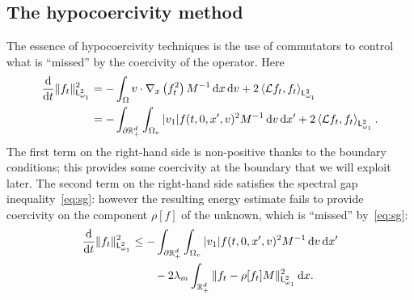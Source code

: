 \documentclass[11pt]{amsart}
\theoremstyle{definition}
\theoremstyle{remark}
\numberwithin{equation}{section}
\newcommand\R{{\mathbb R}}
\newcommand{\dd}{{\, \mathrm d}}
\newcommand{\dt}{\frac{{\rm d}}{{\rm d}t}}
\newcommand{\init}{\text{{\tiny {\rm in}}}}
\newcommand{\sfL}{\mathsf{L}}
\begin{document}

\subsection{The hypocoercivity method}

The essence of hypocoercivity techniques is the use of commutators to control what is ``missed'' by the coercivity of the operator. Here
\begin{align*}
  \dt \Vert f_t \Vert_{\sfL^2_{\omega_1}}^{2}
  & = - \int_\Omega v \cdot \nabla_x \left( f_t^2 \right) M^{-1} \dd x \dd v + 2 \left\langle \mathcal Lf_t , f_t \right\rangle_{\sfL^2_{\omega_1}} \\
  & = - \int_{\partial \R_+^d} \int_{\Omega_v} |v_1| f(t,0,x',v)^2 M^{-1} \dd v \dd x' + 2 \left\langle \mathcal Lf_t , f_t \right\rangle_{\sfL^2_{\omega_1}}.
\end{align*}
The first term on the right-hand side is non-positive thanks to the boundary conditions; this provides some coercivity at the boundary that we will exploit later. The second term on the right-hand side satisfies the spectral gap inequality~\eqref{eq:sg}: however the resulting energy estimate fails to provide coercivity on the component $\rho[f]$ of the unknown, which is ``missed'' by~\eqref{eq:sg}:
\begin{align}
  \nonumber  
  \dt \Vert f_t \Vert_{\sfL^2_{\omega_1}}^{2}
  &\le - \int_{\partial \R_+^d} \int_{\Omega_v} |v_1| f(t,0,x',v)^2 M^{-1} \dd v \dd x'  \\
  \label{eq:hypoco}
  &\qquad- 2 \lambda_m  \int_{\R_+^d}   \| f_t - \rho[f_t] M \|_{\sfL^2_{\omega_1}}^2\dd x.
 \end{align}
\end{document}
